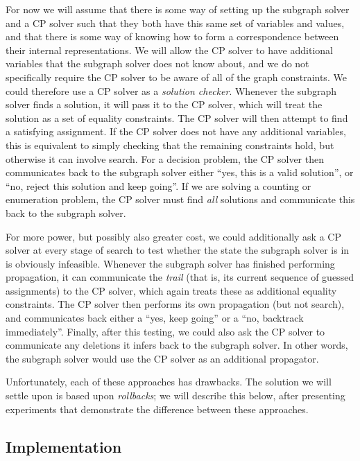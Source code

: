 \documentclass[runningheads]{llncs}
\begin{document}
For now we will assume that there is some way of setting up the subgraph solver and a CP solver such
that they both have this same set of variables and values, and that there is some way of knowing how
to form a correspondence between their internal representations. We will allow the CP solver to have
additional variables that the subgraph solver does not know about, and we do not specifically
require the CP solver to be aware of all of the graph constraints. We could therefore use a CP
solver as a \emph{solution checker}. Whenever the subgraph solver finds a solution, it will pass it
to the CP solver, which will treat the solution as a set of equality constraints. The CP solver will
then attempt to find a satisfying assignment. If the CP solver does not have any additional
variables, this is equivalent to simply checking that the remaining constraints hold, but otherwise
it can involve search. For a decision problem, the CP solver then communicates back to the subgraph
solver either ``yes, this is a valid solution'', or ``no, reject this solution and keep going''. If
we are solving a counting or enumeration problem, the CP solver must find \emph{all} solutions and
communicate this back to the subgraph solver.

For more power, but possibly also greater cost, we could additionally ask a CP solver at every stage
of search to test whether the state the subgraph solver is in is obviously infeasible.  Whenever the
subgraph solver has finished performing propagation, it can communicate the \emph{trail} (that is,
its current sequence of guessed assignments) to the CP solver, which again treats these as
additional equality constraints. The CP solver then performs its own propagation (but not search),
and communicates back either a ``yes, keep going'' or a ``no, backtrack immediately''.  Finally,
after this testing, we could also ask the CP solver to communicate any deletions it infers back to
the subgraph solver. In other words, the subgraph solver would use the CP solver as an additional
propagator.

Unfortunately, each of these approaches has drawbacks. The solution we will settle upon is based
upon \emph{rollbacks}; we will describe this below, after presenting experiments that demonstrate
the difference between these approaches.

\subsection{Implementation}
\end{document}
